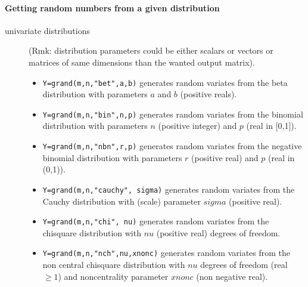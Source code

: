 \paragraph{Getting random numbers from a given distribution}

\begin{description}
\item[univariate distributions] (Rmk: distribution parameters
  could be either scalars or vectors or matrices of same dimensions
  than the wanted output matrix).
  
\begin{itemize}
\item {} \verb!Y=grand(m,n,"bet",a,b)! generates random variates from 
  the beta distribution with parameters $a$ and $b$ (positive reals).

\item {} 
  \verb!Y=grand(m,n,"bin",n,p)!  generates random variates from the binomial 
  distribution with parameters $n$ (positive integer) and $p$
  (real in [0,1]).

\item {} 
  \verb!Y=grand(m,n,"nbn",r,p)! generates random variates from the negative binomial 
  distribution with parameters $r$ (positive real) and $p$ (real 
  in (0,1)).
  
\item {} 
  \verb!Y=grand(m,n,"cauchy", sigma)! generates random variates from the Cauchy distribution 
  with (scale) parameter $sigma$ (positive real).
  
\item {} 
  \verb!Y=grand(m,n,"chi", nu)! generates random variates from the chisquare distribution 
  with $nu$ (positive real) degrees of freedom. 
  
\item {} 
  \verb!Y=grand(m,n,"nch",nu,xnonc)! generates random variates from the non central chisquare
  distribution with $nu$ degrees of freedom (real $\ge 1$) and
  noncentrality parameter $xnonc$ (non negative real).
  

\end{itemize}
\end{description}
